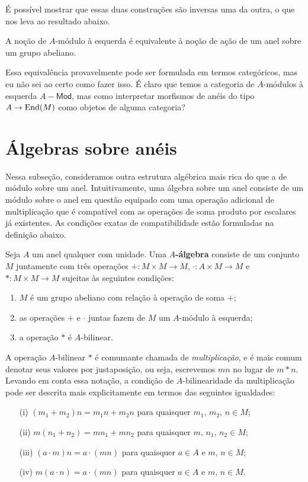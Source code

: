 É possível mostrar que essas duas construções são inversas uma da outra, o que nos leva ao resultado abaixo.

\begin{teo}
  A noção de $A$-módulo à esquerda é equivalente à noção de ação de um anel sobre um grupo abeliano.
\end{teo}

Essa equivalência provavelmente pode ser formulada em termos categóricos, mas eu não sei ao certo como fazer isso.
É claro que temos a categoria de $A$-módulos à esquerda $A-\mathsf{Mod}$, mas como interpretar morfismos de anéis do tipo $A \to \mathrm{End}(M)$ como objetos de alguma categoria?

\section{Álgebras sobre anéis}

Nessa subseção, consideramos outra estrutura algébrica mais rica do que a de módulo sobre um anel.
Intuitivamente, uma álgebra sobre um anel consiste de um módulo sobre o anel em questão equipado com uma operação adicional de multiplicação que é compatível com as operações de soma produto por escalares já existentes.
As condições exatas de compatibilidade estão formuladas na definição abaixo.

\begin{defin}
  Seja $A$ um anel qualquer com unidade.
  Uma \textbf{$A$-álgebra} consiste de um conjunto $M$ juntamente com três operações $+: M \times M \to M$, $\cdot: A \times M \to M$ e $*: M \times M \to M$ sujeitas às seguintes condições:
  \begin{enumerate}
  \item $M$ é um grupo abeliano com relação à operação de soma $+$;
    
  \item as operações $+$ e $\cdot$ juntas fazem de $M$ um $A$-módulo à esquerda;
    
  \item a operação $*$ é $A$-bilinear.
  \end{enumerate}
\end{defin}

A operação $A$-bilinear $*$ é comumante chamada de \emph{multiplicação}, e é mais comum denotar seus valores por justaposição, ou seja, escrevemos $mn$ no lugar de $m*n$.
Levando em conta essa notação, a condição de $A$-bilinearidade da multiplicação pode ser descrita mais explicitamente em termos das seguintes igualdades:
\begin{enumerate}
\item[(i)] $(m_1+m_2)n = m_1n+m_2n$ para quaisquer $m_1,\,m_2,\, n \in M$;
  
\item[(ii)] $m(n_1+n_2) = mn_1 + mn_2$ para quaisquer $m,\,n_1,\,n_2 \in M$;
  
\item[(iii)] $(a \cdot m)n = a \cdot(mn)$ para quaisquer $a \in A$ e $m,\,n \in M$;
  
\item[(iv)] $m(a \cdot n) = a \cdot (mn)$ para quaisquer $a \in A$ e $m,\, n \in M$.
\end{enumerate}

